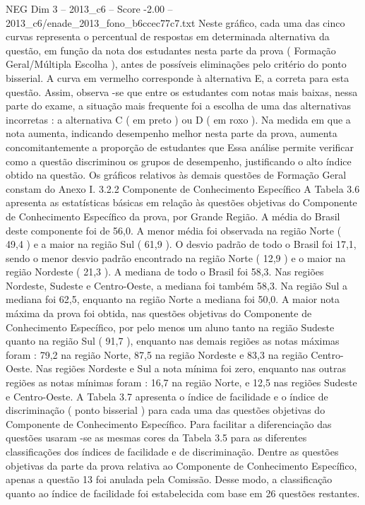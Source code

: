 \begin{textsample}{NEG Dim 3 – 2013\_c6 – Score -2.00 – 2013\_c6/enade\_2013\_fono\_b6ccec77c7.txt}
Neste gráfico, cada uma das cinco curvas representa o percentual de respostas em determinada alternativa da questão, em função da nota dos estudantes nesta parte da prova ( Formação Geral/Múltipla Escolha ), antes de possíveis eliminações pelo critério do ponto bisserial.
A curva em vermelho corresponde à alternativa E, a correta para esta questão.
Assim, observa -se que entre os estudantes com notas mais baixas, nessa parte do exame, a situação mais frequente foi a escolha de uma das alternativas incorretas : a alternativa C ( em preto ) ou D ( em roxo ).
Na medida em que a nota aumenta, indicando desempenho melhor nesta parte da prova, aumenta concomitantemente a proporção de estudantes que Essa análise permite verificar como a questão discriminou os grupos de desempenho, justificando o alto índice obtido na questão.
Os gráficos relativos às demais questões de Formação Geral constam do Anexo I. 3.2.2 Componente de Conhecimento Específico A Tabela 3.6 apresenta as estatísticas básicas em relação às questões objetivas do Componente de Conhecimento Específico da prova, por Grande Região.
A média do Brasil deste componente foi de 56,0.
A menor média foi observada na região Norte ( 49,4 ) e a maior na região Sul ( 61,9 ).
O desvio padrão de todo o Brasil foi 17,1, sendo o menor desvio padrão encontrado na região Norte ( 12,9 ) e o maior na região Nordeste ( 21,3 ).
A mediana de todo o Brasil foi 58,3.
Nas regiões Nordeste, Sudeste e Centro-Oeste, a mediana foi também 58,3.
Na região Sul a mediana foi 62,5, enquanto na região Norte a mediana foi 50,0.
A maior nota máxima da prova foi obtida, nas questões objetivas do Componente de Conhecimento Específico, por pelo menos um aluno tanto na região Sudeste quanto na região Sul ( 91,7 ), enquanto nas demais regiões as notas máximas foram : 79,2 na região Norte, 87,5 na região Nordeste e 83,3 na região Centro-Oeste.
Nas regiões Nordeste e Sul a nota mínima foi zero, enquanto nas outras regiões as notas mínimas foram : 16,7 na região Norte, e 12,5 nas regiões Sudeste e Centro-Oeste.
A Tabela 3.7 apresenta o índice de facilidade e o índice de discriminação ( ponto bisserial ) para cada uma das questões objetivas do Componente de Conhecimento Específico.
Para facilitar a diferenciação das questões usaram -se as mesmas cores da Tabela 3.5 para as diferentes classificações dos índices de facilidade e de discriminação.
Dentre as questões objetivas da parte da prova relativa ao Componente de Conhecimento Específico, apenas a questão 13 foi anulada pela Comissão.
Desse modo, a classificação quanto ao índice de facilidade foi estabelecida com base em 26 questões restantes.

\end{textsample}
